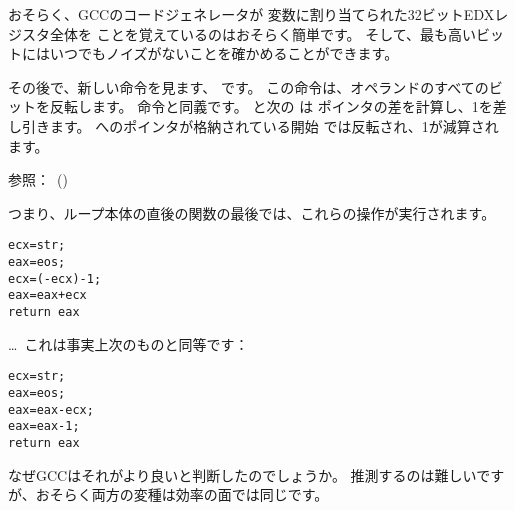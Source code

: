 おそらく、GCCのコードジェネレータが \Tchar 変数に割り当てられた32ビットEDXレジスタ全体を
ことを覚えているのはおそらく簡単です。
そして、最も高いビットにはいつでもノイズがないことを確かめることができます。

\label{strlen_NOT_ADD}

その後で、新しい命令を見ます、 \NOT です。 この命令は、オペランドのすべてのビットを反転します。
命令と同義です。 
\NOT と次の \ADD は ポインタの差を計算し、1を差し引きます。 
へのポインタが格納されている開始 \ECX では反転され、1が減算されます。

参照：\q{\SignedNumbersSectionName}~()

つまり、ループ本体の直後の関数の最後では、これらの操作が実行されます。

\begin{lstlisting}[style=customc]
ecx=str;
eax=eos;
ecx=(-ecx)-1; 
eax=eax+ecx
return eax
\end{lstlisting}

\dots~これは事実上次のものと同等です：

\begin{lstlisting}[style=customc]
ecx=str;
eax=eos;
eax=eax-ecx;
eax=eax-1;
return eax
\end{lstlisting}

なぜGCCはそれがより良いと判断したのでしょうか。
推測するのは難しいですが、おそらく両方の変種は効率の面では同じです。
